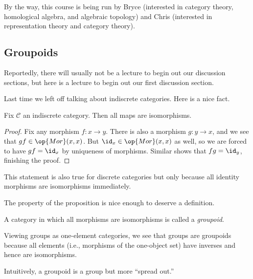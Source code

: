 \documentclass[../notes.tex]{subfiles}
\begin{document}

By the way, this course is being run by Bryce (interested in category theory, homological algebra, and algebraic topology) and Chris (interested in representation theory and category theory).


\subsection{Groupoids}
Reportedly, there will usually not be a lecture to begin out our discussion sections, but here is a lecture to begin out our first discussion section.

Last time we left off talking about indiscrete categories. Here is a nice fact.
\begin{proposition}
	Fix $\mathcal C$ an indiscrete category. Then all maps are isomorphisms.
\end{proposition}
\begin{proof}
	Fix any morphism $f:x\to y$. There is also a morphism $g:y\to x$, and we see that $gf\in\op{Mor}(x,x)$. But $\id_x\in\op{Mor}(x,x)$ as well, so we are forced to have $gf=\id_x$ by uniqueness of morphisms. Similar shows that $fg=\id_y$, finishing the proof.
\end{proof}
\begin{remark}
	This statement is also true for discrete categories but only because all identity morphisms are isomorphisms immediately.
\end{remark}
The property of the proposition is nice enough to deserve a definition.
\begin{definition}[Groupoid]
	A category in which all morphisms are isomorphisms is called a \textit{groupoid}.
\end{definition}
\begin{example}
	Viewing groups as one-element categories, we see that groups are groupoids because all elements (i.e., morphisms of the one-object set) have inverses and hence are isomorphisms.
\end{example}
Intuitively, a groupoid is a group but more ``spread out.''
\end{document}
